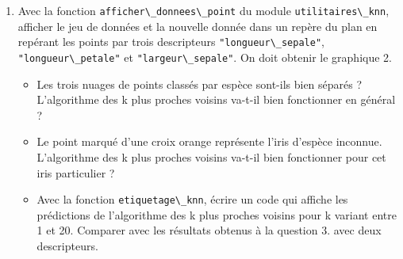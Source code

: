 \documentclass[
  11pt,
]{article}
\newcommand{\passthrough}[1]{#1}
\providecommand{\tightlist}{%
  \setlength{\itemsep}{0pt}\setlength{\parskip}{0pt}}
\newcounter{thme}
\newcounter{def}
\newcounter{alg}
\begin{document}
\begin{enumerate}
\def\labelenumi{\arabic{enumi}.}
\setcounter{enumi}{3}
\item
  Avec la fonction \passthrough{\lstinline!afficher\_donnees\_point!} du
  module \passthrough{\lstinline!utilitaires\_knn!}, afficher le jeu de
  données et la nouvelle donnée dans un repère du plan en repérant les
  points par trois descripteurs
  \passthrough{\lstinline!"longueur\_sepale"!},
  \passthrough{\lstinline!"longueur\_petale"!} et
  \passthrough{\lstinline!"largeur\_sepale"!}. On doit obtenir le
  graphique 2.

  \begin{itemize}
  \tightlist
  \item
    Les trois nuages de points classés par espèce sont-ils bien séparés
    ? L'algorithme des k plus proches voisins va-t-il bien fonctionner
    en général ?
  \item
    Le point marqué d'une croix orange représente l'iris d'espèce
    inconnue. L'algorithme des k plus proches voisins va-t-il bien
    fonctionner pour cet iris particulier ?
  \item
    Avec la fonction \passthrough{\lstinline!etiquetage\_knn!}, écrire
    un code qui affiche les prédictions de l'algorithme des k plus
    proches voisins pour k variant entre 1 et 20. Comparer avec les
    résultats obtenus à la question 3. avec deux descripteurs.
  \end{itemize}
\end{enumerate}
\end{document}
